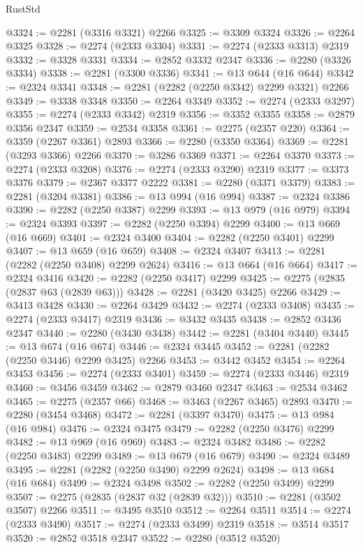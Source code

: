 \begin{lexlean}{RustStd}
\begin{coremodule}
{\begin{coremodule}
{{{{{{{{{{{{{{@3324 := @2281 (@3316 @3321) @2266
@3325 := @3309 @3324
@3326 := @2264 @3325
@3328 := @2274 (@2333 @3304)
@3331 := @2274 (@2333 @3313) @2319
@3332 := @3328 @3331
@3334 := @2852 @3332 @2347
@3336 := @2280 (@3326 @3334)
@3338 := @2281 (@3300 @3336)
@3341 := @13 @644 (@16 @644)
@3342 := @2324 @3341
@3348 := @2281 (@2282 (@2250 @3342) @2299 @3321) @2266
@3349 := @3338 @3348
@3350 := @2264 @3349
@3352 := @2274 (@2333 @3297)
@3355 := @2274 (@2333 @3342) @2319
@3356 := @3352 @3355
@3358 := @2879 @3356 @2347
@3359 := @2534 @3358
@3361 := @2275 (@2357 @220)
@3364 := @3359 (@2267 @3361) @2893
@3366 := @2280 (@3350 @3364)
@3369 := @2281 (@3293 @3366) @2266
@3370 := @3286 @3369
@3371 := @2264 @3370
@3373 := @2274 (@2333 @3208)
@3376 := @2274 (@2333 @3290) @2319
@3377 := @3373 @3376
@3379 := @2367 @3377 @2222
@3381 := @2280 (@3371 @3379)
@3383 := @2281 (@3204 @3381)
@3386 := @13 @994 (@16 @994)
@3387 := @2324 @3386
@3390 := @2282 (@2250 @3387) @2299
@3393 := @13 @979 (@16 @979)
@3394 := @2324 @3393
@3397 := @2282 (@2250 @3394) @2299
@3400 := @13 @669 (@16 @669)
@3401 := @2324 @3400
@3404 := @2282 (@2250 @3401) @2299
@3407 := @13 @659 (@16 @659)
@3408 := @2324 @3407
@3413 := @2281 (@2282 (@2250 @3408) @2299 @2624)
@3416 := @13 @664 (@16 @664)
@3417 := @2324 @3416
@3420 := @2282 (@2250 @3417) @2299
@3425 := @2275 (@2835 (@2837 @63 (@2839 @63)))
@3428 := @2281 (@3420 @3425) @2266
@3429 := @3413 @3428
@3430 := @2264 @3429
@3432 := @2274 (@2333 @3408)
@3435 := @2274 (@2333 @3417) @2319
@3436 := @3432 @3435
@3438 := @2852 @3436 @2347
@3440 := @2280 (@3430 @3438)
@3442 := @2281 (@3404 @3440)
@3445 := @13 @674 (@16 @674)
@3446 := @2324 @3445
@3452 := @2281 (@2282 (@2250 @3446) @2299 @3425) @2266
@3453 := @3442 @3452
@3454 := @2264 @3453
@3456 := @2274 (@2333 @3401)
@3459 := @2274 (@2333 @3446) @2319
@3460 := @3456 @3459
@3462 := @2879 @3460 @2347
@3463 := @2534 @3462
@3465 := @2275 (@2357 @66)
@3468 := @3463 (@2267 @3465) @2893
@3470 := @2280 (@3454 @3468)
@3472 := @2281 (@3397 @3470)
@3475 := @13 @984 (@16 @984)
@3476 := @2324 @3475
@3479 := @2282 (@2250 @3476) @2299
@3482 := @13 @969 (@16 @969)
@3483 := @2324 @3482
@3486 := @2282 (@2250 @3483) @2299
@3489 := @13 @679 (@16 @679)
@3490 := @2324 @3489
@3495 := @2281 (@2282 (@2250 @3490) @2299 @2624)
@3498 := @13 @684 (@16 @684)
@3499 := @2324 @3498
@3502 := @2282 (@2250 @3499) @2299
@3507 := @2275 (@2835 (@2837 @32 (@2839 @32)))
@3510 := @2281 (@3502 @3507) @2266
@3511 := @3495 @3510
@3512 := @2264 @3511
@3514 := @2274 (@2333 @3490)
@3517 := @2274 (@2333 @3499) @2319
@3518 := @3514 @3517
@3520 := @2852 @3518 @2347
@3522 := @2280 (@3512 @3520)
}}}}}}}}}}}}}}
\end{coremodule}}
\end{coremodule}
\end{lexlean}
